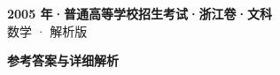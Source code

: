 \documentclass[zihao=-4, a4paper]{ctexart}
\begin{document}
\begin{center}
  {\Large\bfseries 2005 年·普通高等学校招生考试·浙江卷·文科}\\[4pt]
  {\large 数学 · 解析版}
\end{center}
\medskip
{}

\clearpage
{}
\begin{center}{\Large\bfseries 参考答案与详细解析}\end{center}
\medskip

\end{document}
